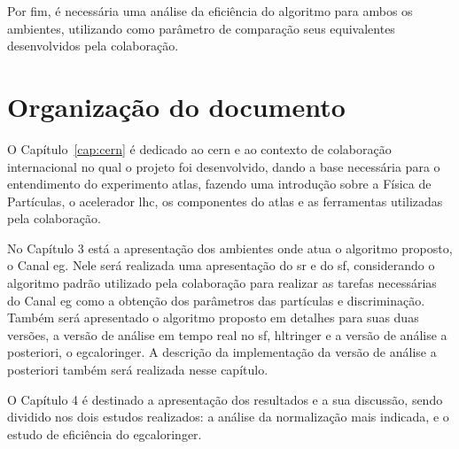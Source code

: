 Por fim, é necessária uma análise da eficiência do algoritmo para ambos os
ambientes, utilizando como parâmetro de comparação seus equivalentes 
desenvolvidos pela colaboração.

\section{Organização do documento} {{{

O Capítulo~\ref{cap:cern} é dedicado ao \gls{cern} e ao contexto de colaboração internacional
no qual o projeto foi desenvolvido, dando a base necessária para o entendimento
do experimento \gls{atlas}, fazendo uma introdução sobre a Física de Partículas,
o acelerador \gls{lhc}, os componentes do \gls{atlas} e as ferramentas
utilizadas pela colaboração.

No Capítulo 3 está a apresentação dos ambientes onde atua o algoritmo proposto,
o Canal \acrshort{eg}. Nele será realizada uma apresentação do \gls{sr} e do
\gls{sf}, considerando o algoritmo padrão utilizado pela colaboração para
realizar as tarefas necessárias do Canal \gls{eg} como a obtenção dos parâmetros
das partículas e discriminação. Também será apresentado o algoritmo proposto em
detalhes para suas duas versões, a versão de análise em tempo real no \gls{sf},
\gls{hltringer} e a versão de análise a posteriori, o \gls{egcaloringer}. A
descrição da implementação da versão de análise a posteriori também será realizada nesse capítulo. 

O Capítulo 4 é destinado a apresentação dos resultados e a sua discussão,
sendo dividido nos dois estudos realizados: a análise da normalização mais
indicada, e o estudo de eficiência do \gls{egcaloringer}. 
}}}
